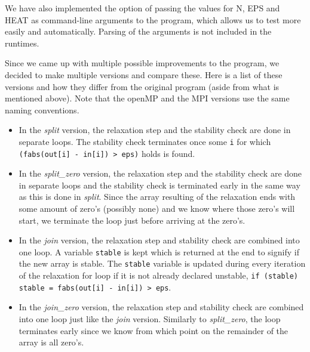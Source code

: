 \documentclass[a4paper]{article}
\begin{document}
We have also implemented the option of passing the values for N, EPS and HEAT as command-line arguments to the program, which allows us to test more easily and automatically. Parsing of the arguments is not included in the runtimes.

Since we came up with multiple possible improvements to the program, we decided to make multiple versions and compare these. Here is a list of these versions and how they differ from the original program (aside from what is mentioned above). Note that the openMP and the MPI versions use the same naming conventions.
\begin{itemize}
    \item
        In the \textit{split} version, the relaxation step and the stability check are done in separate loops. The stability check terminates once some \texttt{i} for which \texttt{(fabs(out[i] - in[i]) > eps)} holds is found.
    \item
        In the \textit{split\_zero} version, the relaxation step and the stability check are done in separate loops and the stability check is terminated early in the same way as this is done in \textit{split}. Since the array resulting of the relaxation ends with some amount of zero's (possibly none) and we know where those zero's will start, we terminate the loop just before arriving at the zero's.
    \item
        In the \textit{join} version, the relaxation step and stability check are combined into one loop. A variable \texttt{stable} is kept which is returned at the end to signify if the new array is stable. The \texttt{stable} variable is updated during every iteration of the relaxation for loop if it is not already declared unstable, \texttt{if (stable) stable = fabs(out[i] - in[i]) > eps}.
    \item
        In the \textit{join\_zero} version, the relaxation step and stability check are combined into one loop just like the \textit{join} version. Similarly to \textit{split\_zero}, the loop terminates early since we know from which point on the remainder of the array is all zero's.
\end{itemize}

\end{document}
